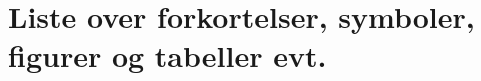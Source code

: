\documentclass[12pt, norsk]{article}
\begin{document}

\begin{titlepage}      %

\end{titlepage}


\pagestyle{fancy}       %
\renewcommand{\headrulewidth}{0pt}   %
\fancyhead{}            %
\fancyfoot{}
\fancyfoot[R]{\thepage} %
\normalfont             %

\newpage

\newpage

\tableofcontents %
\section*{Liste over forkortelser, symboler, figurer og tabeller evt.}
\listoffigures   %
\listoftables    %
\newpage

\setcounter{page}{1}   %




\newpage




\newpage




\newpage


\newpage


\newpage


\newpage



\printbibliography
\newpage

\setcounter{page}{1}  %
\appendix

\end{document}
